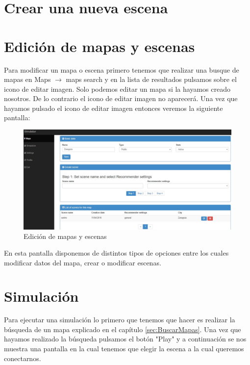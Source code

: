 \section{Crear una nueva escena}\label{sec:crearEscena}



\section{Edición de mapas y escenas}

Para modificar un mapa o escena primero tenemos que realizar una busque de mapas en Maps $\rightarrow$ maps search y en la lista de resultados pulsamos sobre el icono de editar imagen. Solo podemos editar un mapa si la hayamos creado nosotros. De lo contrario el icono de editar imagen no aparecerá. Una vez que hayamos pulsado el icono de editar imagen entonces veremos la siguiente pantalla:

\begin{figure}[H]
	\centering\includegraphics[scale=0.25]{imagenes/capitulo10/capitulo10.jpg}
	\caption{Edición de mapas y escenas}
	\label{img:UpdateMapScene}
\end{figure}

En esta pantalla disponemos de distintos tipos de opciones entre los cuales modificar datos del mapa, crear o modificar escenas.

\section{Simulación}

Para ejecutar una simulación lo primero que tenemos que hacer es realizar la búsqueda de un mapa explicado en el capítulo \ref{sec:BuscarMapas}. Una vez que hayamos realizado la búsqueda pulsamos el botón "Play" y a continuación se nos muestra una pantalla en la cual tenemos que elegir la escena a la cual queremos conectarnos.

